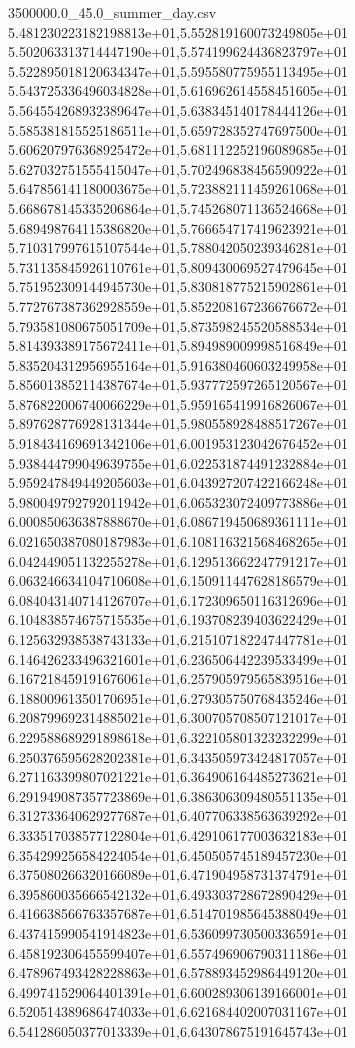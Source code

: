 \begin{filecontents*}{3500000.0_45.0_summer_day.csv}
5.481230223182198813e+01,5.552819160073249805e+01
5.502063313714447190e+01,5.574199624436823797e+01
5.522895018120634347e+01,5.595580775955113495e+01
5.543725336496034828e+01,5.616962614558451605e+01
5.564554268932389647e+01,5.638345140178444126e+01
5.585381815525186511e+01,5.659728352747697500e+01
5.606207976368925472e+01,5.681112252196089685e+01
5.627032751555415047e+01,5.702496838456590922e+01
5.647856141180003675e+01,5.723882111459261068e+01
5.668678145335206864e+01,5.745268071136524668e+01
5.689498764115386820e+01,5.766654717419623921e+01
5.710317997615107544e+01,5.788042050239346281e+01
5.731135845926110761e+01,5.809430069527479645e+01
5.751952309144945730e+01,5.830818775215902861e+01
5.772767387362928559e+01,5.852208167236676672e+01
5.793581080675051709e+01,5.873598245520588534e+01
5.814393389175672411e+01,5.894989009998516849e+01
5.835204312956955164e+01,5.916380460603249958e+01
5.856013852114387674e+01,5.937772597265120567e+01
5.876822006740066229e+01,5.959165419916826067e+01
5.897628776928131344e+01,5.980558928488517267e+01
5.918434169691342106e+01,6.001953123042676452e+01
5.938444799049639755e+01,6.022531874491232884e+01
5.959247849449205603e+01,6.043927207422166248e+01
5.980049792792011942e+01,6.065323072409773886e+01
6.000850636387888670e+01,6.086719450689361111e+01
6.021650387080187983e+01,6.108116321568468265e+01
6.042449051132255278e+01,6.129513662247791217e+01
6.063246634104710608e+01,6.150911447628186579e+01
6.084043140714126707e+01,6.172309650116312696e+01
6.104838574675715535e+01,6.193708239403622429e+01
6.125632938538743133e+01,6.215107182247447781e+01
6.146426233496321601e+01,6.236506442239533499e+01
6.167218459191676061e+01,6.257905979565839516e+01
6.188009613501706951e+01,6.279305750768435246e+01
6.208799692314885021e+01,6.300705708507121017e+01
6.229588689291898618e+01,6.322105801323232299e+01
6.250376595628202381e+01,6.343505973424817057e+01
6.271163399807021221e+01,6.364906164485273621e+01
6.291949087357723869e+01,6.386306309480551135e+01
6.312733640629277687e+01,6.407706338563639292e+01
6.333517038577122804e+01,6.429106177003632183e+01
6.354299256584224054e+01,6.450505745189457230e+01
6.375080266320166089e+01,6.471904958731374791e+01
6.395860035666542132e+01,6.493303728672890429e+01
6.416638566763357687e+01,6.514701985645388049e+01
6.437415990541914823e+01,6.536099730500336591e+01
6.458192306455599407e+01,6.557496906790311186e+01
6.478967493428228863e+01,6.578893452986449120e+01
6.499741529064401391e+01,6.600289306139166001e+01
6.520514389686474033e+01,6.621684402007031167e+01
6.541286050377013339e+01,6.643078675191645743e+01

\end{filecontents*}

